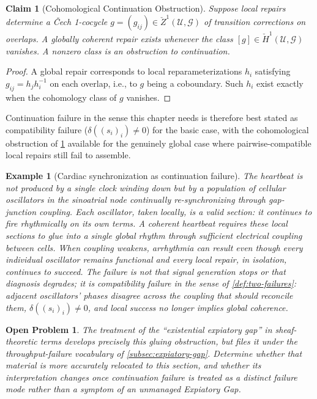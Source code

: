 \documentclass[12pt]{report}
\newtheorem{claim}[definition]{Claim}
\newtheorem{example}[definition]{Example}
\newtheorem{openproblem}[definition]{Open Problem}
\begin{document}
\begin{claim}[Cohomological Continuation Obstruction]
\label{thm:continuation-obstruction}
Suppose local repairs determine a \v{C}ech 1-cocycle $g = (g_{ij}) \in
\check{Z}^1(\mathcal{U},\mathcal{G})$ of transition corrections on
overlaps. A globally coherent repair exists whenever the class $[g] \in
\check{H}^1(\mathcal{U},\mathcal{G})$ vanishes. A nonzero class is an
obstruction to continuation.
\end{claim}

\begin{proof}
A global repair corresponds to local reparameterizations $h_i$ satisfying
$g_{ij} = h_j h_i^{-1}$ on each overlap, i.e., to $g$ being a coboundary.
Such $h_i$ exist exactly when the cohomology class of $g$ vanishes.
\end{proof}

Continuation failure in the sense this chapter needs is therefore best
stated as compatibility failure ($\delta((s_i)_i) \neq 0$) for the basic
case, with the cohomological obstruction of
\cref{thm:continuation-obstruction} available for the genuinely global
case where pairwise-compatible local repairs still fail to assemble.

\begin{example}[Cardiac synchronization as continuation failure]
\label{ex:pacemaker}
The heartbeat is not produced by a single clock winding down but by a
population of cellular oscillators in the sinoatrial node continually
re-synchronizing through gap-junction coupling. Each oscillator, taken
locally, is a valid section: it continues to fire rhythmically on its own
terms. A coherent heartbeat requires these local sections to glue into a
single global rhythm through sufficient electrical coupling between cells.
When coupling weakens, arrhythmia can result even though every individual
oscillator remains functional and every local repair, in isolation,
continues to succeed. The failure is not that signal generation stops or
that diagnosis degrades; it is compatibility failure in the sense of
\cref{def:two-failures}: adjacent oscillators' phases disagree across the
coupling that should reconcile them, $\delta((s_i)_i) \neq 0$, and local
success no longer implies global coherence.
\end{example}

\begin{openproblem}
The treatment of the ``existential expiatory gap'' in
sheaf-theoretic terms develops precisely this gluing
obstruction, but files it under the throughput-failure vocabulary of
\cref{subsec:expiatory-gap}. Determine whether that material is more
accurately relocated to this section, and whether its interpretation
changes once continuation failure is treated as a distinct failure mode
rather than a symptom of an unmanaged Expiatory Gap.
\end{openproblem}
\end{document}
